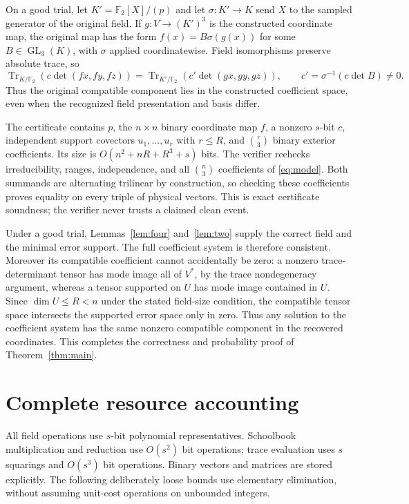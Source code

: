 \documentclass[11pt]{article}
\newcommand{\F}{\mathbb F}
\newcommand{\Tr}{\operatorname{Tr}}
\begin{document}
On a good trial, let $K'=\F_2[X]/(p)$ and let $\sigma:K'\to K$ send $X$
to the sampled generator of the original field. If $g:V\to(K')^3$ is the
constructed coordinate map, the original map has the form
$f(x)=B\sigma(g(x))$ for some $B\in\operatorname{GL}_3(K)$, with $\sigma$
applied coordinatewise. Field isomorphisms preserve absolute trace, so
\[
 \Tr_{K/\F_2}(c\det(fx,fy,fz))
 =\Tr_{K'/\F_2}(c'\det(gx,gy,gz)),\qquad
 c'=\sigma^{-1}(c\det B)\ne0.
\]
Thus the original compatible component lies in the constructed coefficient
space, even when the recognized field presentation and basis differ.

The certificate contains $p$, the $n\times n$ binary coordinate map $f$,
a nonzero $s$-bit $c$, independent support covectors $u_1,\ldots,u_r$ with
$r\leq R$, and $\binom r3$ binary exterior coefficients. Its size is
$O(n^2+nR+R^3+s)$ bits. The verifier rechecks irreducibility, ranges,
independence, and all $\binom n3$ coefficients of \eqref{eq:model}. Both
summands are alternating trilinear by construction, so checking these
coefficients proves equality on every triple of physical vectors. This is
exact certificate soundness; the verifier never trusts a claimed clean event.

Under a good trial, Lemmas~\ref{lem:four} and~\ref{lem:two} supply the correct
field and the minimal error support. The full coefficient system is therefore
consistent. Moreover its compatible coefficient cannot accidentally be zero:
a nonzero trace-determinant tensor has mode image all of $V^*$, by the trace
nondegeneracy argument, whereas a tensor supported on $U$ has mode image
contained in $U$. Since $\dim U\leq R<n$ under the stated field-size condition,
the compatible tensor space intersects the supported error space only in zero.
Thus any solution to the coefficient system has the same nonzero compatible
component in the recovered coordinates. This completes the correctness and
probability proof of Theorem~\ref{thm:main}.

\section{Complete resource accounting}
All field operations use $s$-bit polynomial representatives. Schoolbook
multiplication and reduction use $O(s^2)$ bit operations; trace evaluation
uses $s$ squarings and $O(s^3)$ bit operations. Binary vectors and matrices
are stored explicitly. The following deliberately loose bounds use elementary
elimination, without assuming unit-cost operations on unbounded integers.
\end{document}
